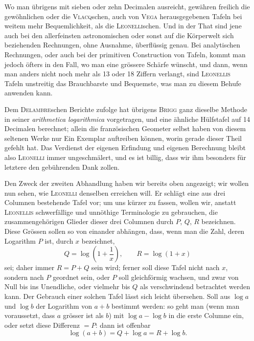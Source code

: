 Wo man übrigens mit sieben oder zehn Decimalen ausreicht, gewähren freilich die gewöhnlichen oder die \textsc{Vlacq}schen, auch von \textsc{Vega} herausgegebenen Tafeln bei weitem mehr Bequemlichkeit, als die \textsc{Leonelli}schen. Und in der That sind jene auch bei den allerfeinsten astronomischen oder sonst auf die Körperwelt sich beziehenden Rechnungen, ohne Ausnahme, überflüssig genau. Bei analytischen Rechnungen, oder auch bei der primitiven Construction von Tafeln, kommt man jedoch öfters in den Fall, wo man eine grössere Schärfe wünscht, und dann, wenn man anders nicht noch mehr als 13 oder 18 Ziffern verlangt, sind \textsc{Leonellis} Tafeln unstreitig das Brauchbarste und Bequemste, was man zu diesem Behufe anwenden kann.

Dem \textsc{Delambre}schen Berichte zufolge hat übrigens \textsc{Brigg} ganz dieselbe Methode in seiner \emph{arithmetica logarithmica} vorgetragen, und eine ähnliche Hülfstafel auf 14 Decimalen berechnet; allein die französischen Geometer selbst haben von diesem seltenen Werke nur Ein Exemplar auftreiben können, worin gerade dieser Theil gefehlt hat. Das Verdienst der eigenen Erfindung und eigenen Berechnung bleibt also \textsc{Leonelli} immer ungeschmälert, und es ist billig, dass wir ihm besonders für letztere den gebührenden Dank zollen.

Den Zweck der zweiten Abhandlung haben wir bereits oben angezeigt; wir wollen nun sehen, wie \textsc{Leonelli} denselben erreichen will. Er schlägt eine aus drei Columnen bestehende Tafel vor; um uns kürzer zu fassen, wollen wir, anstatt \textsc{Leonellis} schwerfällige und unnöthige Terminologie zu gebrauchen, die zusammengehörigen Glieder dieser drei Columnen durch $P$, $Q$, $R$ bezeichnen. Diese Grössen sollen so von einander abhängen, dass, wenn man die Zahl, deren Logarithm $P$ ist, durch $x$ bezeichnet,
\[
Q = \log\left(1+\frac{1}{x}\right), \qquad R = \log(1+x)
\]
sei; daher immer $R = P+Q$ sein wird; ferner soll diese Tafel nicht nach $x$, sondern nach $P$ geordnet sein, oder $P$ soll gleichförmig wachsen, und zwar von Null bis ins Unendliche, oder vielmehr bis $Q$ als verschwindend betrachtet werden kann. Der Gebrauch einer solchen Tafel lässt sich leicht übersehen. Soll aus $\log a$ und $\log b$ der Logarithm von $a+b$ bestimmt werden: so geht man (wenn man voraussetzt, dass $a$ grösser ist als $b$) mit $\log a - \log b$ in die erste Columne ein, oder setzt diese Differenz $= P$: dann ist offenbar
\[
\log(a+b) = Q + \log a = R + \log b.
\]

